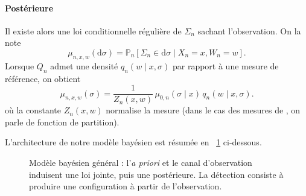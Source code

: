 \paragraph{Postérieure}
Il existe alors une loi conditionnelle régulière de $\Sigma_n$ sachant l'observation. On la note
\begin{equation}
    \mu_{n,x,w}(\mathrm d\sigma)
    =
    \mathbb P_n\left[\Sigma_n\in\mathrm d\sigma\mid X_n=x,W_n=w\right].
    \label{eq:chapII_posterieure_def}
\end{equation}
Lorsque $Q_n$ admet une densité $q_n(w\mid x,\sigma)$ par rapport à une mesure de référence, on obtient
\begin{equation}
    \mu_{n,x,w}(\sigma)
    =
    \frac{1}{Z_n(x,w)}\,
    \mu_{0,n}(\sigma\mid x)\,q_n(w\mid x,\sigma).
    \label{eq:chapII_posterieure_densite}
\end{equation}
où la constante $Z_n(x,w)$ normalise la mesure (dans le cas des mesures de , on parle de fonction de partition).

L'architecture de notre modèle bayésien est résumée en \Fig~\ref{fig:chapII_modele_bayesien} ci-dessous.

\begin{figure}[H]
\centering
{}
\caption{Modèle bayésien général : l'\emph{a priori} et le canal d'observation induisent une loi jointe, puis une postérieure. La détection consiste à produire une configuration à partir de l'observation.}
\label{fig:chapII_modele_bayesien}
\end{figure}

